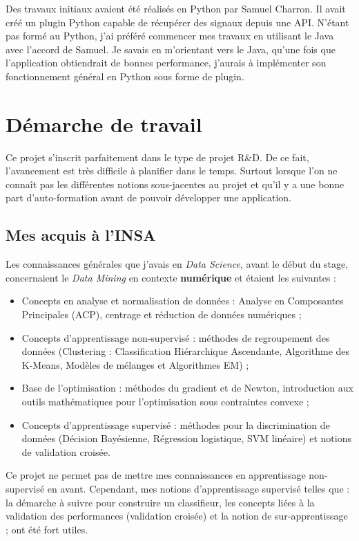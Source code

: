 Des travaux initiaux avaient été réalisés en Python par Samuel Charron. Il avait créé un plugin Python capable de récupérer des signaux depuis une API. N'étant pas formé au Python, j'ai préféré commencer mes travaux en utilisant le Java avec l'accord de Samuel. Je savais en m'orientant vers le Java, qu'une fois que l'application obtiendrait de bonnes performance, j'aurais à implémenter son fonctionnement général en Python sous forme de plugin.

\section{Démarche de travail}
    Ce projet s'inscrit parfaitement dans le type de projet R\&D. De ce fait, l'avancement est très difficile à planifier dans le temps. Surtout lorsque l'on ne connaît pas les différentes notions sous-jacentes au projet et qu'il y a une bonne part d'auto-formation avant de pouvoir développer une application.

    \subsection{Mes acquis à l'INSA}
        Les connaissances générales que j'avais en \textit{Data Science}, avant le début du stage, concernaient le \textit{Data Mining} en contexte \textbf{numérique} et étaient les suivantes :
        \begin{itemize}
            \item Concepts en analyse et normalisation de données : Analyse en Composantes Principales (ACP), centrage et réduction de données numériques ;
            \item Concepts d'apprentissage non-supervisé : méthodes de regroupement des données (Clustering : Classification Hiérarchique Ascendante, Algorithme des K-Means, Modèles de mélanges et Algorithmes EM) ;
            \item Base de l'optimisation : méthodes du gradient et de Newton, introduction aux outils mathématiques pour l'optimisation sous contraintes convexe ;
            \item Concepts d'apprentissage supervisé : méthodes pour la discrimination de données (Décision Bayésienne, Régression logistique, SVM linéaire) et notions de validation croisée.\\
        \end{itemize}

        Ce projet ne permet pas de mettre mes connaissances en apprentissage non-supervisé en avant. Cependant, mes notions d'apprentissage supervisé telles que : la démarche à suivre pour construire un classifieur, les concepts liées à la validation des performances (validation croisée) et la notion de sur-apprentissage ; ont été fort utiles.\\

